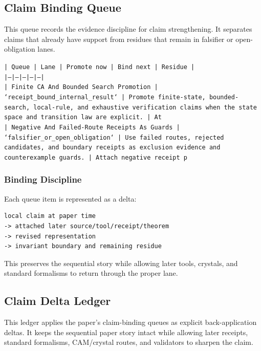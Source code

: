 \documentclass[11pt]{article}
\begin{document}
\subsection*{Claim Binding Queue}

This queue records the evidence discipline for claim strengthening. It separates claims that already have support from residues that remain in falsifier or open-obligation lanes.

\noindent\texttt{| Queue | Lane | Promote now | Bind next | Residue |}\\
\noindent\texttt{|---|---|---|---|---|}\\
\noindent\texttt{| Finite CA And Bounded Search Promotion | `receipt\_bound\_internal\_result` | Promote finite-state, bounded-search, local-rule, and exhaustive verification claims when the state space and transition law are explicit. | At}\\
\noindent\texttt{| Negative And Failed-Route Receipts As Guards | `falsifier\_or\_open\_obligation` | Use failed routes, rejected candidates, and boundary receipts as exclusion evidence and counterexample guards. | Attach negative receipt p}\\

\subsubsection*{Binding Discipline}

Each queue item is represented as a delta:

\begin{verbatim}
local claim at paper time
-> attached later source/tool/receipt/theorem
-> revised representation
-> invariant boundary and remaining residue
\end{verbatim}

This preserves the sequential story while allowing later tools, crystals, and
standard formalisms to return through the proper lane.

\subsection*{Claim Delta Ledger}

This ledger applies the paper's claim-binding queues as explicit back-application
deltas. It keeps the sequential paper story intact while allowing later
receipts, standard formalisms, CAM/crystal routes, and validators to sharpen the
claim.
\end{document}
